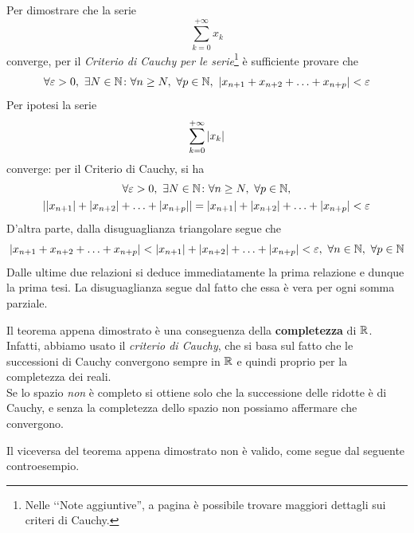 \begin{demonstration}
	Per dimostrare che la serie
	\begin{equation*}
		\sum_{k=0}^{+\infty}x_k
	\end{equation*}
	converge, per il \textit{Criterio di Cauchy per le serie}\footnote{Nelle ‘‘Note aggiuntive'', a pagina \pageref{criteriodicauchy} è possibile trovare maggiori dettagli sui criteri di Cauchy.} è sufficiente provare che
	\begin{equation*}
		\forall \epsilon>0,\ \exists N\in\naturalset\colon\forall n\geq N,\ \forall p\in\naturalset,\ \abs{x_{n+1}+x_{n+2}+\ldots+x_{n+p}}<\epsilon
	\end{equation*}
	Per ipotesi la serie
	\begin{equation*}
		\sum_{k=0}^{+\infty}\abs{x_k}
	\end{equation*}
	converge: per il Criterio di Cauchy, si ha
	\begin{gather*}
		\forall \varepsilon>0,\ \exists N\in\mathbb{N}\colon\forall n\geq N,\ \forall p\in\mathbb{N},\\ \abs{\abs{x_{n+1}}+\abs{x_{n+2}}+\ldots+\abs{x_{n+p}}}=\abs{x_{n+1}}+\abs{x_{n+2}}+\ldots+\abs{x_{n+p}}<\varepsilon
	\end{gather*}
	D’altra parte, dalla disuguaglianza triangolare segue che
	\begin{equation*}
		\abs{x_{n+1}+x_{n+2}+\ldots+x_{n+p}}<\abs{x_{n+1}}+\abs{x_{n+2}}+\ldots+\abs{x_{n+p}}<\epsilon,\ \forall n\in\naturalset,\ \forall p\in\naturalset
	\end{equation*}
Dalle ultime due relazioni si deduce immediatamente la prima relazione e dunque la prima tesi. La disuguaglianza segue dal fatto che essa è vera per ogni somma parziale.
\end{demonstration}
\begin{observe}\label{convergenzaassolutadipendedacauchy}
	Il teorema appena dimostrato è una conseguenza della \textbf{completezza} di $\mathbb{R}$. Infatti, abbiamo usato il \textit{criterio di Cauchy}, che si basa sul fatto che le successioni di Cauchy convergono sempre in $\mathbb{R}$ e quindi proprio per la completezza dei reali.\\
	Se lo spazio \textit{non} è completo si ottiene solo che la successione delle ridotte è di Cauchy, e senza la completezza dello spazio non possiamo affermare che convergono.
\end{observe}
Il viceversa del teorema appena dimostrato non è valido, come segue dal seguente controesempio.
